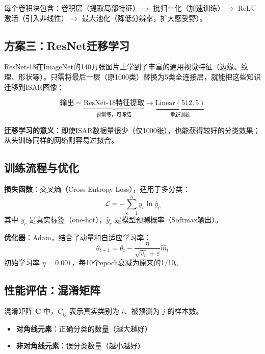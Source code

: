 \documentclass[12pt, a4paper]{article}
\newcommand{\mat}[1]{\boldsymbol{#1}}
\begin{document}
每个卷积块包含：卷积层（提取局部特征）$\to$ 批归一化（加速训练）$\to$ ReLU激活（引入非线性）$\to$ 最大池化（降低分辨率，扩大感受野）。

\subsection{方案三：ResNet迁移学习}

ResNet-18在ImageNet的140万张图片上学到了丰富的通用视觉特征（边缘、纹理、形状等）。只需将最后一层（原1000类）替换为5类全连接层，就能把这些知识迁移到ISAR图像：

\begin{equation}
\text{输出} = \underbrace{\text{ResNet-18特征提取}}_{\text{预训练，可冻结}} \longrightarrow \underbrace{\text{Linear}(512, 5)}_{\text{重新训练}}
\end{equation}

\textbf{迁移学习的意义}：即使ISAR数据量很少（仅1000张），也能获得较好的分类效果；从头训练同样的网络则容易过拟合。

\subsection{训练流程与优化}

\textbf{损失函数}：交叉熵（Cross-Entropy Loss），适用于多分类：
\begin{equation}
\mathcal{L} = -\sum_{c=1}^{5} y_c \ln\hat{y}_c
\end{equation}
其中 $y_c$ 是真实标签（one-hot），$\hat{y}_c$ 是模型预测概率（Softmax输出）。

\textbf{优化器}：Adam，结合了动量和自适应学习率：
\begin{equation}
\theta_{t+1} = \theta_t - \frac{\eta}{\sqrt{\hat{v}_t}+\varepsilon}\hat{m}_t
\end{equation}
初始学习率 $\eta = 0.001$，每10个epoch衰减为原来的1/10。

\subsection{性能评估：混淆矩阵}

混淆矩阵 $\mat{C}$ 中，$C_{ij}$ 表示真实类别为 $i$、被预测为 $j$ 的样本数。
\begin{itemize}
  \item \textbf{对角线元素}：正确分类的数量（越大越好）
  \item \textbf{非对角线元素}：误分类数量（越小越好）
\end{itemize}
\end{document}
